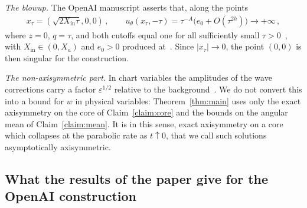 \documentclass[11pt,reqno]{amsproc}
\numberwithin{equation}{section}
\theoremstyle{remark}
\newcommand{\abs}[1]{\left|#1\right|}
\newcommand{\eps}{\varepsilon}
\begin{document}
\noindent\emph{The blowup.} The OpenAI manuscript asserts that, along the points
\begin{align}
x_\tau=(\sqrt{2X_{\mathrm{in}}\tau},0,0)
\,,\qquad
u_\theta(x_\tau,-\tau)=\tau^{-A}\bigl(e_0+O(\tau^{2h})\bigr)\longrightarrow+\infty
\,,
\label{eq:properties:blowup}
\end{align}
where $z=0$, $q=\tau$, and both cutoffs equal one for all sufficiently small $\tau>0$~\cite[equations~(10.20)--(10.21), p.~124]{OpenAIManuscript}, with $X_{\mathrm{in}}\in(0,X_a)$ and $e_0>0$ produced at~\cite[Theorem~3.1(iv) and equation~(3.6), p.~16]{OpenAIManuscript}. Since $\abs{x_\tau}\to0$, the point $(0,0)$ is then singular for the construction.

\smallskip
\noindent\emph{The non-axisymmetric part.} In chart variables the amplitudes of the wave corrections carry a factor $\eps^{1/2}$ relative to the background~\cite[equation~(9.9), p.~106, with Definition~6.5 and equation~(6.29), p.~70]{OpenAIManuscript}. We do not convert this into a bound for $w$ in physical variables: Theorem~\ref{thm:main} uses only the exact axisymmetry on the core of Claim~\ref{claim:core} and the bounds on the angular mean of Claim~\ref{claim:mean}. It is in this sense, exact axisymmetry on a core which collapses at the parabolic rate as $t\uparrow0$, that we call such solutions asymptotically axisymmetric.

\subsection{What the results of the paper give for the OpenAI construction}
\label{sec:properties:criteria}
\end{document}
